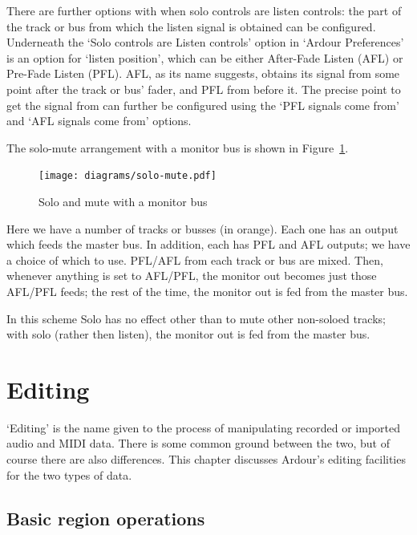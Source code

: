 \documentclass[10pt,a4paper]{book}
\begin{document}
{There are further options with when solo controls are listen controls:
the part of the track or bus from which the listen signal is obtained
can be configured.  Underneath the `Solo controls are Listen controls'
option in `Ardour Preferences' is an option for `listen position',
which can be either After-Fade Listen (AFL) or Pre-Fade Listen (PFL).
AFL, as its name suggests, obtains its signal from some point after
the track or bus' fader, and PFL from before it.  The precise point to
get the signal from can further be configured using the `PFL signals
come from' and `AFL signals come from' options.

The solo-mute arrangement with a monitor bus is shown in Figure~\ref{fig:solo-mute}.

\begin{figure}[ht]
\begin{center}
\texttt{[image: diagrams/solo-mute.pdf]}
\end{center}
\caption{Solo and mute with a monitor bus}
\label{fig:solo-mute}
\end{figure}

Here we have a number of tracks or busses (in orange).  Each one has
an output which feeds the master bus.  In addition, each has PFL and
AFL outputs; we have a choice of which to use.  PFL/AFL from each
track or bus are mixed.  Then, whenever anything is set to AFL/PFL,
the monitor out becomes just those AFL/PFL feeds; the rest of the
time, the monitor out is fed from the master bus.

In this scheme Solo has no effect other than to mute other non-soloed
tracks; with solo (rather then listen), the monitor out is fed from
the master bus.



\chapter{Editing}

`Editing' is the name given to the process of manipulating recorded or
imported audio and MIDI data.  There is some common ground between the
two, but of course there are also differences.  This chapter discusses
Ardour's editing facilities for the two types of data.


\section{Basic region operations}

}
\end{document}
